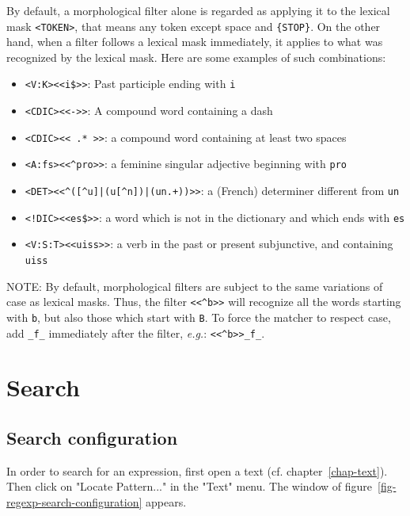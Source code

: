 \noindent By default, a morphological filter alone is regarded as applying it to the lexical
mask \verb$<TOKEN>$, that means any token except space and \verb+{STOP}+. On the other hand,
when a filter follows a lexical mask immediately, it applies to what was recognized by the lexical
mask. Here are some examples of such combinations:

\begin{itemize}
  \item \verb+<V:K><<i$>>+: Past participle ending with \verb$i$
  \item \verb!<CDIC><<->>!: A compound word containing a dash
  \item \verb!<CDIC><< .* >>!: a compound word containing at least two spaces
  \item \verb!<A:fs><<^pro>>!: a feminine singular adjective beginning with \verb$pro$
  \item \verb!<DET><<^([^u]|(u[^n])|(un.+))>>!: a (French) determiner different from \verb$un$
  \item \verb+<!DIC><<es$>>+: a word which is not in the dictionary and which ends with \verb$es$
  \item \verb!<V:S:T><<uiss>>!: a verb in the past or present subjunctive, and containing \verb$uiss$
\end{itemize}

\noindent {}NOTE: By default, morphological filters are
subject to the same variations of case as lexical masks. Thus, the filter
\verb$<<^b>>$ will recognize all the words starting with
\texttt{b}, but also those which start with \texttt{B}. 
To force the matcher to respect case, add \verb+_f_+ immediately
after the filter, \textit{e.g.}: \verb+<<^b>>_f_+.



\section{Search}
\subsection{Search configuration}
In order to search for an expression, first open a text (cf.
chapter~\ref{chap-text}). Then click on "Locate Pattern..." in the "Text" menu.
The window of
figure~\ref{fig-regexp-search-configuration}
appears.

